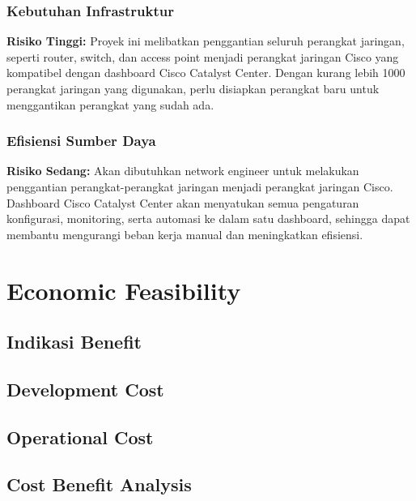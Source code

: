\subsubsection{Kebutuhan Infrastruktur}

\textbf{Risiko Tinggi:} Proyek ini melibatkan penggantian seluruh perangkat jaringan, seperti router, switch, dan access point menjadi perangkat jaringan Cisco yang kompatibel dengan dashboard Cisco Catalyst Center. Dengan kurang lebih 1000 perangkat jaringan yang digunakan, perlu disiapkan perangkat baru untuk menggantikan perangkat yang sudah ada.

\subsubsection{Efisiensi Sumber Daya}

\textbf{Risiko Sedang:} Akan dibutuhkan network engineer untuk melakukan penggantian perangkat-perangkat jaringan menjadi perangkat jaringan Cisco. Dashboard Cisco Catalyst Center akan menyatukan semua pengaturan konfigurasi, monitoring, serta automasi ke dalam satu dashboard, sehingga dapat membantu mengurangi beban kerja manual dan meningkatkan efisiensi.



\section{Economic Feasibility}


\subsection{Indikasi Benefit}


\subsection{Development Cost}

\subsection{Operational Cost}

\subsection{Cost Benefit Analysis}

